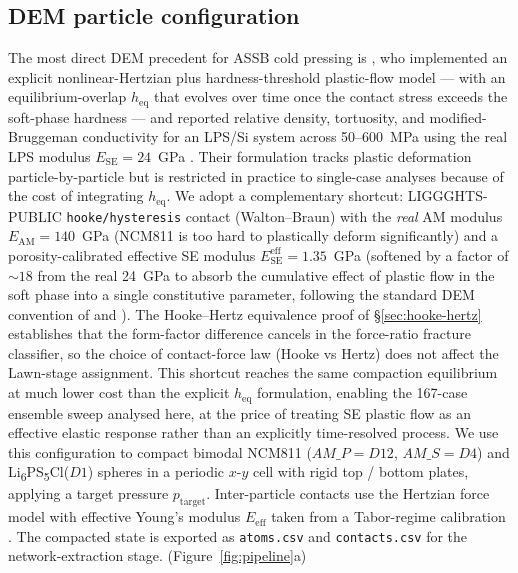 \documentclass[11pt, a4paper]{article}
\newcommand{\AMP}{AM\_P}
\newcommand{\AMS}{AM\_S}
\newcommand{\LPSCl}{Li\textsubscript{6}PS\textsubscript{5}Cl}
\begin{document}
\subsection{DEM particle configuration}
\label{sec:methods-dem}


The most direct DEM precedent for ASSB cold pressing is
\citet{So2021}, who implemented an explicit nonlinear-Hertzian plus
hardness-threshold plastic-flow model --- with an equilibrium-overlap
$h_{\mathrm{eq}}$ that evolves over time once the contact stress
exceeds the soft-phase hardness --- and reported relative density,
tortuosity, and modified-Bruggeman conductivity for an LPS/Si system
across 50--600~MPa using the real LPS modulus $E_{\mathrm{SE}} = 24$~GPa
\citep{Sakuda2013}.  Their formulation tracks plastic deformation
particle-by-particle but is restricted in practice to single-case
analyses because of the cost of integrating $h_{\mathrm{eq}}$.  We
adopt a complementary shortcut: LIGGGHTS-PUBLIC \citep{Kloss2012}
\texttt{hooke/hysteresis} contact (Walton--Braun) with the
\emph{real} AM modulus $E_{\mathrm{AM}} = 140$~GPa (NCM811 is too
hard to plastically deform significantly) and a porosity-calibrated
effective SE modulus $E_{\mathrm{SE}}^{\mathrm{eff}} = 1.35$~GPa
(softened by a factor of $\sim 18$ from the real 24~GPa to absorb
the cumulative effect of plastic flow in the soft phase into a single
constitutive parameter, following the standard DEM convention of
\citet{CundallStrack1979} and \citet{Thornton1997}).  The Hooke--Hertz
equivalence proof of \S\ref{sec:hooke-hertz} establishes that the
form-factor difference cancels in the force-ratio fracture
classifier, so the choice of contact-force law (Hooke vs Hertz) does
not affect the Lawn-stage assignment.  This shortcut reaches the
same compaction equilibrium at much lower cost than the explicit
$h_{\mathrm{eq}}$ formulation, enabling the 167-case ensemble sweep
analysed here, at the price of treating SE plastic flow as an
effective elastic response rather than an explicitly time-resolved
process.  We use this configuration to compact bimodal NCM811
($\AMP = D12$, $\AMS = D4$) and \LPSCl ($D1$) spheres in a periodic
$x$-$y$ cell with rigid top / bottom plates, applying a target
pressure $p_{\mathrm{target}}$. Inter-particle contacts use the
Hertzian force model with effective Young's modulus
$E_{\mathrm{eff}}$ taken from a Tabor-regime calibration
\citep{Sakuda2013, Lee2020}. The compacted state is exported as
\texttt{atoms.csv} and \texttt{contacts.csv} for the network-extraction
stage. (Figure~\ref{fig:pipeline}a)
\end{document}
